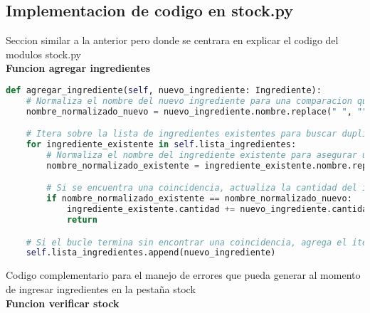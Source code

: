\documentclass[a4paper,12pt]{article}
\begin{document}
\subsection{Implementacion de codigo en stock.py}
Seccion similar a la anterior pero donde se centrara en explicar el codigo del modulos stock.py\\
\textbf{Funcion agregar ingredientes}\\
\newpage
\begin{lstlisting}[language=Python, caption={Cambio de codigo}, frame=single]
def agregar_ingrediente(self, nuevo_ingrediente: Ingrediente):
    # Normaliza el nombre del nuevo ingrediente para una comparacion que no distinga mayusculas ni espacios.
    nombre_normalizado_nuevo = nuevo_ingrediente.nombre.replace(" ", "").lower()

    # Itera sobre la lista de ingredientes existentes para buscar duplicados.
    for ingrediente_existente in self.lista_ingredientes:
        # Normaliza el nombre del ingrediente existente para asegurar una comparacin justa.
        nombre_normalizado_existente = ingrediente_existente.nombre.replace(" ", "").lower()

        # Si se encuentra una coincidencia, actualiza la cantidad del ingrediente existente.
        if nombre_normalizado_existente == nombre_normalizado_nuevo:
            ingrediente_existente.cantidad += nuevo_ingrediente.cantidad
            return

    # Si el bucle termina sin encontrar una coincidencia, agrega el item como un ingrediente nuevo.
    self.lista_ingredientes.append(nuevo_ingrediente)
\end{lstlisting}
Codigo complementario para el manejo de errores que pueda generar al momento de ingresar ingredientes en la pestaña stock\\
\newpage
\textbf{Funcion verificar stock}
\end{document}
